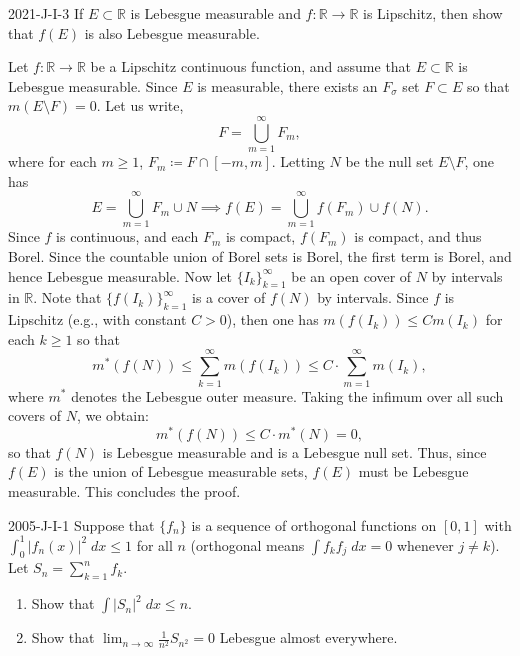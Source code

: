 \documentclass{article}
\begin{document}
	\begin{prb}{2021-J-I-3}
		If $E \subset \mathbb{R}$ is Lebesgue measurable and $f: \mathbb{R} \to \mathbb{R}$ is Lipschitz, then show that $f(E)$ is also Lebesgue measurable. 
	\end{prb}
	Let $f: \mathbb{R} \to \mathbb{R}$ be a Lipschitz continuous function, and assume that $E \subset \mathbb{R}$ is Lebesgue measurable. Since $E$ is measurable, there exists an $F_{\sigma}$ set $F \subset E$ so that $m(E \setminus F) = 0$. Let us write, 
	\begin{equation*}
		F = \bigcup_{m = 1}^{\infty}F_{m}, 
	\end{equation*}
	where for each $m \geq 1$, $F_{m} \coloneqq F \cap [-m,m]$. Letting $N$ be the null set $E \setminus F$, one has 
	\begin{equation*}
		E = \bigcup_{m = 1}^{\infty}F_{m} \cup N \implies f(E) = \bigcup_{m = 1}^{\infty}f(F_{m}) \cup f(N). 
	\end{equation*}
	Since $f$ is continuous, and each $F_{m}$ is compact, $f(F_{m})$ is compact, and thus Borel. Since the countable union of Borel sets is Borel, the first term is Borel, and hence Lebesgue measurable. Now let $\{I_{k}\}_{k = 1}^{\infty}$ be an open cover of $N$ by intervals in $\mathbb{R}$. Note that $\{f(I_{k})\}_{k =1 }^{\infty}$ is a cover of $f(N)$ by intervals. Since $f$ is Lipschitz (e.g., with constant $C> 0$), then one has $m(f(I_{k})) \leq C m(I_{k})$ for each $k \geq 1$ so that 
	\begin{equation*}
		m^{\ast}(f(N)) \leq \sum_{k = 1}^{\infty}m(f(I_{k})) \leq C \cdot \sum_{m = 1}^{\infty}m(I_{k}), 
	\end{equation*}
	where $m^{\ast}$ denotes the Lebesgue outer measure. Taking the infimum over all such covers of $N$, we obtain: 
	\begin{equation*}
		m^{\ast}(f(N)) \leq C \cdot m^{\ast}(N) = 0, 
	\end{equation*}
	so that $f(N)$ is Lebesgue measurable and is a Lebesgue null set. Thus, since $f(E)$ is the union of Lebesgue measurable sets, $f(E)$ must be Lebesgue measurable. This concludes the proof. 
	\begin{prb}{2005-J-I-1}
		Suppose that $\{f_n\}$ is a sequence of orthogonal functions on $[0,1]$ with \newline $\int_{0}^{1}|f_n(x)|^2\;dx \leq 1$ for all $n$ (orthogonal means $\int f_{k}f_{j}\;dx = 0$ whenever $j \neq k$). Let $S_n = \sum_{k = 1}^{n}f_{k}$. \vspace{-0.25cm}
		\begin{enumerate}[itemsep =-2pt,label = (\alph{*})]
			\item Show that $\int|S_{n}|^2\;dx \leq n$. 
			\item Show that $\lim_{n \to \infty}\frac{1}{n^2}S_{n^2} = 0$ Lebesgue almost everywhere. 
		\end{enumerate}
	\end{prb}
\end{document}
